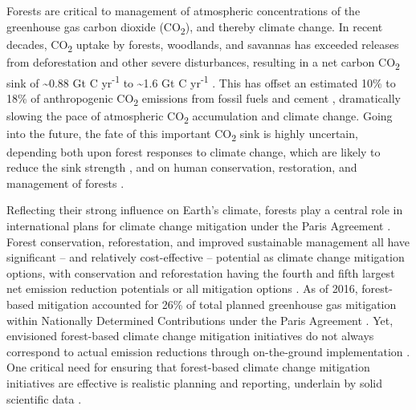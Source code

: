 \documentclass[, manuscript]{copernicus}
\begin{document}
Forests are critical to management of atmospheric concentrations of the
greenhouse gas carbon dioxide (CO\textsubscript{2}), and thereby climate
change. In recent decades, CO\textsubscript{2} uptake by forests,
woodlands, and savannas has exceeded releases from deforestation and
other severe disturbances, resulting in a net carbon CO\textsubscript{2}
sink of \textasciitilde0.88 Gt C yr\textsuperscript{-1} \citep[all
biomes with trees,][]{xu_changes_2021} to \textasciitilde1.6 Gt C
yr\textsuperscript{-1} \citep[forests only,][]{harris_global_2021}. This
has offset an estimated 10\% to 18\% of anthropogenic
CO\textsubscript{2} emissions from fossil fuels and cement
\citep{xu_changes_2021, harris_global_2021}, dramatically slowing the
pace of atmospheric CO\textsubscript{2} accumulation and climate change.
Going into the future, the fate of this important CO\textsubscript{2}
sink is highly uncertain, depending both upon forest responses to
climate change, which are likely to reduce the sink strength
\citep{mcdowell_pervasive_2020, hammond_global_2022}, and on human
conservation, restoration, and management of forests
\citep{ipcc_climate_2019, ipcc_climate_2022}.

Reflecting their strong influence on Earth's climate, forests play a
central role in international plans for climate change mitigation under
the Paris Agreement \citep{unfccc_adoption_2015}. Forest conservation,
reforestation, and improved sustainable management all have significant
-- and relatively cost-effective -- potential as climate change
mitigation options, with conservation and reforestation having the
fourth and fifth largest net emission reduction potentials or all
mitigation options \citep{ipcc_summary_2022}. As of 2016, forest-based
mitigation accounted for 26\% of total planned greenhouse gas mitigation
within Nationally Determined Contributions under the Paris Agreement
\citep{grassi_key_2017}. Yet, envisioned forest-based climate change
mitigation initiatives do not always correspond to actual emission
reductions through on-the-ground implementation
\citep[e.g.,][]{badgley_systematic_2022}. One critical need for ensuring
that forest-based climate change mitigation initiatives are effective is
realistic planning and reporting, underlain by solid scientific data
\citep{anderson-teixeira_effective_2022, deng_comparing_2021}.
\end{document}
